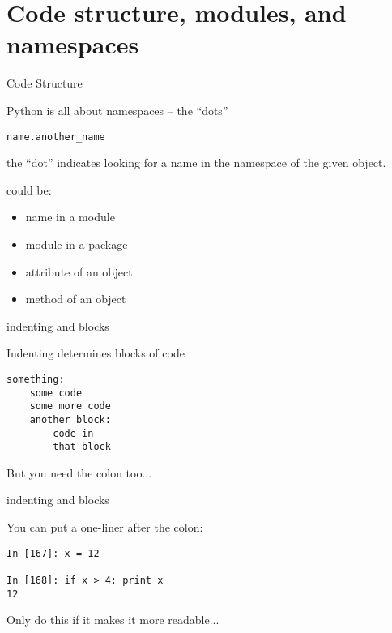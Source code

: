 \documentclass{beamer}
\begin{document}
\section{Code structure, modules, and namespaces}

\begin{frame}[fragile]{Code Structure}

{\Large Python is all about namespaces --  the ``dots'' }

\vspace{0.2in}
\verb+name.another_name+
\vspace{0.2in}

the ``dot'' indicates looking for a name in the namespace of the given object.

could be:

\begin{itemize}
\item name in a module
\item module in a package
\item attribute of an object
\item method of an object
\end{itemize}

\end{frame}

\begin{frame}[fragile]{indenting and blocks}

{\Large  Indenting determines blocks of code }

\vfill
\begin{verbatim}
something:
    some code
    some more code
    another block:
        code in 
        that block
\end{verbatim}

\vfill
{\Large But you need the colon too...}

\end{frame}

\begin{frame}[fragile]{indenting and blocks}

{\Large  You can put a one-liner after the colon:}

\vfill
\begin{verbatim}
In [167]: x = 12

In [168]: if x > 4: print x
12
\end{verbatim}

\vfill
{\Large Only do this if it makes it more readable...}

\end{frame}
\end{document}
